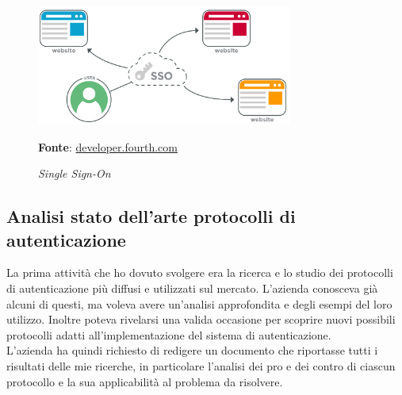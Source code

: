     \begin{figure}[ht]
        \centering
        \includegraphics[width=0.75\textwidth]{immagini/sso.png}
        \caption{\textit{Single Sign-On}}
        \textbf{Fonte}:
        \href{https://developer.fourth.com/en-gb/docs/single-sign-saml}{developer.fourth.com}
        \label{fig: Single Sign-On}
    \end{figure}


    \subsection{Analisi stato dell'arte protocolli di autenticazione}\label{sec:att_analisi}
    La prima attività che ho dovuto svolgere era la ricerca e lo studio dei protocolli di autenticazione più diffusi e utilizzati sul mercato. L'azienda conosceva già alcuni di questi, ma voleva avere un'analisi approfondita e degli esempi del loro utilizzo. Inoltre poteva rivelarsi una valida occasione per scoprire nuovi possibili protocolli adatti all'implementazione del sistema di autenticazione. \\
    L'azienda ha quindi richiesto di redigere un documento che riportasse tutti i risultati delle mie ricerche, in particolare l'analisi dei pro e dei contro di ciascun protocollo e la sua applicabilità al problema da risolvere.

